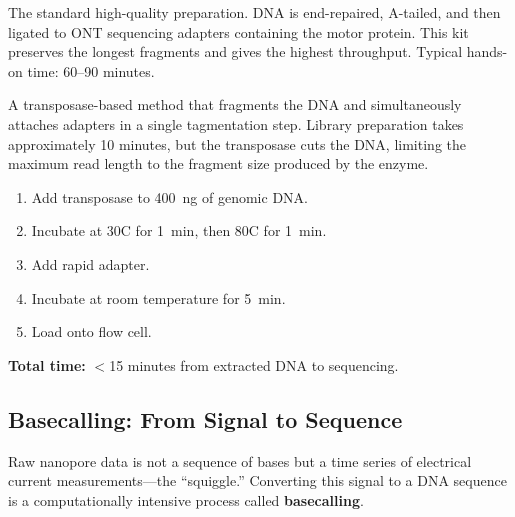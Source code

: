 \begin{description}[style=nextline, font=\bfseries]
  \item[Ligation Sequencing Kit (LSK).] The standard high-quality preparation. DNA is end-repaired, A-tailed, and then ligated to ONT sequencing adapters containing the motor protein. This kit preserves the longest fragments and gives the highest throughput. Typical hands-on time: 60--90 minutes.

  \item[Rapid Sequencing Kit (RAD/RBK).] A transposase-based method that fragments the DNA and simultaneously attaches adapters in a single tagmentation step. Library preparation takes approximately 10 minutes, but the transposase cuts the DNA, limiting the maximum read length to the fragment size produced by the enzyme.
\end{description}

\begin{protocolbox}[title={ONT Rapid Library Prep}]
\begin{enumerate}[nosep]
  \item Add transposase to 400~ng of genomic DNA.
  \item Incubate at 30\textdegree C for 1~min, then 80\textdegree C for 1~min.
  \item Add rapid adapter.
  \item Incubate at room temperature for 5~min.
  \item Load onto flow cell.
\end{enumerate}
\textbf{Total time:} $<$15 minutes from extracted DNA to sequencing.
\end{protocolbox}

\subsection{Basecalling: From Signal to Sequence}

Raw nanopore data is not a sequence of bases but a time series of electrical current measurements---the ``squiggle.'' Converting this signal to a DNA sequence is a computationally intensive process called \textbf{basecalling}.

